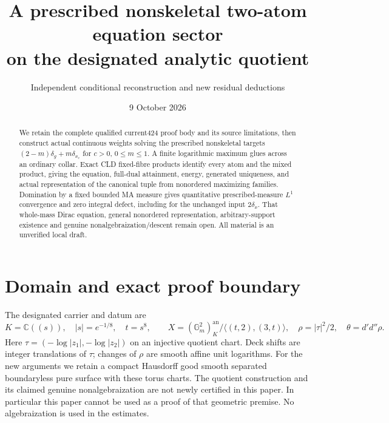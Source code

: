 \documentclass[11pt]{article}
\title{A prescribed nonskeletal two-atom equation sector\\on the designated analytic quotient}
\author{Independent conditional reconstruction and new residual deductions}
\date{9 October 2026}
\newcommand{\DD}{d'd''}
\begin{document}
\maketitle
\begin{abstract}
We retain the complete qualified current424 proof body and its source
limitations, then construct actual continuous weights solving the
prescribed nonskeletal targets $(2-m)\delta_g+m\delta_{x_c}$ for
$c>0$, $0\le m\le1$. A finite logarithmic maximum glues across an
ordinary collar. Exact CLD fixed-fibre products identify every atom and
the mixed product, giving the equation, full-dual attainment, energy,
generated uniqueness, and actual representation of the canonical tuple
from nonordered maximizing families. Domination by a fixed bounded MA
measure gives quantitative prescribed-measure $L^1$ convergence and
zero integral defect, including for the unchanged input $2\delta_x$.
That whole-mass Dirac equation, general nonordered representation,
arbitrary-support existence and genuine nonalgebraization/descent remain
open. All material is an unverified local draft.
\end{abstract}

\section{Domain and exact proof boundary}
The designated carrier and datum are
\[
 K=\mathbb C((s)),\quad |s|=e^{-1/8},\quad t=s^8,\qquad
 X=(\mathbb G_m^2)^{\mathrm{an}}_K/\langle(t,2),(3,t)\rangle,
 \quad \rho=|\tau|^2/2,\quad\theta=\DD\rho.
\]
Here $\tau=(-\log|z_1|,-\log|z_2|)$ on an injective quotient
chart. Deck shifts are integer translations of $\tau$; changes of
$\rho$ are smooth affine unit logarithms. For the new arguments we
retain a compact Hausdorff good smooth separated boundaryless pure
surface with these torus charts. The quotient construction and its
claimed genuine nonalgebraization are not newly certified in this paper.
In particular this paper cannot be used as a proof of that geometric
premise. No algebraization is used in the estimates.
\end{document}
